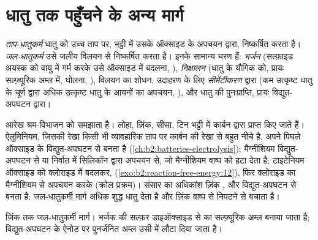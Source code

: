 \section{धातु तक पहुँचने के अन्य मार्ग}

\begin{definition}[ताप-धातुकर्म और जल-धातुकर्म]\label{def:b2:ellingham:metallurgy}
\emph{ताप-धातुकर्म} धातु को उच्च
ताप पर, भट्ठी में उसके ऑक्साइड के अपचयन द्वारा, निष्कर्षित करता है। \emph{जल-धातुकर्म}
उसे जलीय विलयन से निष्कर्षित करता है। इनके सामान्य चरण हैं:
\emph{भर्जन} (सल्फ़ाइड अयस्क को वायु में गर्म करके उसे
ऑक्साइड में बदलना, ), \emph{निक्षालन}
(धातु के यौगिक को, प्रायः सल्फ़्यूरिक अम्ल में, घोलना, ), विलयन का शोधन, उदाहरण के लिए
\emph{सीमेंटीकरण} द्वारा (कम उत्कृष्ट धातु के चूर्ण द्वारा
अधिक उत्कृष्ट धातु के आयनों का अपचयन, ), और
धातु की पुनःप्राप्ति, प्रायः विद्युत-अपघटन द्वारा।
\end{definition}

आरेख श्रम-विभाजन को समझाता है। लोहा, ज़िंक, सीसा, टिन भट्ठी में
कार्बन द्वारा प्राप्त किए जाते हैं। ऐलुमिनियम, जिसकी रेखा किसी भी व्यावहारिक ताप पर कार्बन की
रेखा से बहुत नीचे है, अपने पिघले ऑक्साइड के विद्युत-अपघटन से बनता है
(\cref{ch:b2:batteries-electrolysis}); मैग्नीशियम विद्युत-अपघटन से या
निर्वात में सिलिकॉन द्वारा अपचयन से, जो मैग्नीशियम वाष्प को हटा देता है;
टाइटेनियम ऑक्साइड को क्लोराइड में बदलकर,  (\cref{exo:b2:reaction-free-energy:12}), फिर क्लोराइड का
मैग्नीशियम से अपचयन करके (क्रोल प्रक्रम)। संसार का अधिकांश ज़िंक ,
 और विद्युत-अपघटन से बनता है: जल-धातुकर्मी मार्ग अधिक शुद्ध धातु देता है और
ज़िंक वाष्प से निपटने से बचाता है।

\begin{omfigure}

{\small ज़िंक तक जल-धातुकर्मी मार्ग। भर्जक की सल्फ़र डाइऑक्साइड से
 का सल्फ़्यूरिक अम्ल बनाया जाता है; विद्युत-अपघटन के
ऐनोड पर पुनर्जनित अम्ल उसी में लौटा दिया जाता है।}
\end{omfigure}

